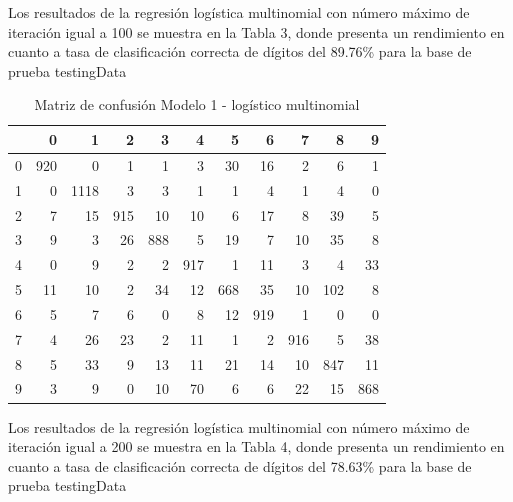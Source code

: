 \documentclass{article}
\begin{document}
Los resultados de la regresión logística multinomial con número máximo de iteración igual a 100 se muestra en la Tabla 3, donde presenta un rendimiento en cuanto a tasa de clasificación correcta de dígitos del 89.76\% para la base de prueba testingData

\begin{table}[H]
\caption{\small{Matriz de confusión Modelo 1 - logístico multinomial}}
\centering
\begin{tabular}{r|rrrrrrrrrr}
  \hline
 & 0 & 1 & 2 & 3 & 4 & 5 & 6 & 7 & 8 & 9 \\ 
  \hline
0 & 920 &   0 &   1 &   1 &   3 &  30 &  16 &   2 &   6 &   1 \\ 
  1 &   0 & 1118 &   3 &   3 &   1 &   1 &   4 &   1 &   4 &   0 \\ 
  2 &   7 &  15 & 915 &  10 &  10 &   6 &  17 &   8 &  39 &   5 \\ 
  3 &   9 &   3 &  26 & 888 &   5 &  19 &   7 &  10 &  35 &   8 \\ 
  4 &   0 &   9 &   2 &   2 & 917 &   1 &  11 &   3 &   4 &  33 \\ 
  5 &  11 &  10 &   2 &  34 &  12 & 668 &  35 &  10 & 102 &   8 \\ 
  6 &   5 &   7 &   6 &   0 &   8 &  12 & 919 &   1 &   0 &   0 \\ 
  7 &   4 &  26 &  23 &   2 &  11 &   1 &   2 & 916 &   5 &  38 \\ 
  8 &   5 &  33 &   9 &  13 &  11 &  21 &  14 &  10 & 847 &  11 \\ 
  9 &   3 &   9 &   0 &  10 &  70 &   6 &   6 &  22 &  15 & 868 \\ 
   \hline
\end{tabular}
\end{table}



Los resultados de la regresión logística multinomial con número máximo de iteración igual a 200 se muestra en la Tabla 4, donde presenta un rendimiento en cuanto a tasa de clasificación correcta de dígitos del 78.63\% para la base de prueba testingData
\end{document}
